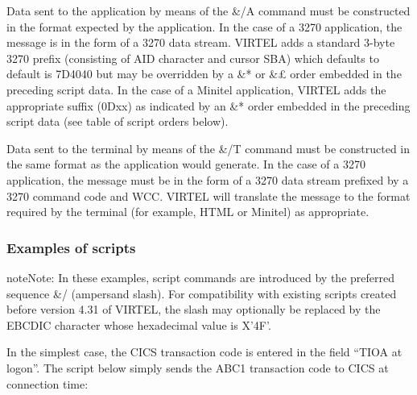 \documentclass[letterpaper,10pt,english]{sphinxmanual}
\begin{document}
Data sent to the application by means of the \&/A command must be constructed in the format expected by the application. In the case of a 3270 application, the message is in the form of a 3270 data stream. VIRTEL adds a standard 3-byte 3270 prefix (consisting of AID character and cursor SBA) which defaults to default is 7D4040 but may be overridden by a \&* or \&£ order embedded in the preceding script data. In the case of a Minitel application, VIRTEL adds the appropriate suffix (0Dxx) as indicated by an \&* order embedded in the preceding script data (see table of script orders below).

Data sent to the terminal by means of the \&/T command must be constructed in the same format as the application would generate. In the case of a 3270 application, the message must be in the form of a 3270 data stream prefixed by a 3270 command code and WCC. VIRTEL will translate the message to the format required by the terminal (for example, HTML or Minitel) as appropriate.


\subsubsection{Examples of scripts}
\label{\detokenize{connectivity_guide:examples-of-scripts}}
\begin{sphinxadmonition}{note}{Note:}
In these examples, script commands are introduced by the preferred sequence \&/ (ampersand slash). For compatibility with existing scripts created before version 4.31 of VIRTEL, the slash may optionally be replaced by the EBCDIC character whose hexadecimal value is X’4F’.
\end{sphinxadmonition}


In the simplest case, the CICS transaction code is entered in the field “TIOA at logon”. The script below simply sends the ABC1 transaction code to CICS at connection time:
\end{document}

